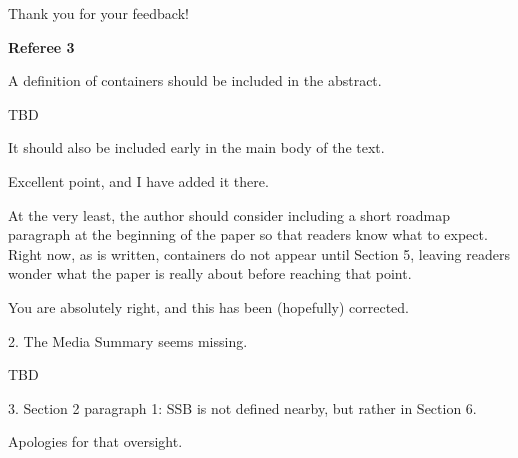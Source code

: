 \begin{response}
    Thank you for your feedback!
\end{response}


\textbf{Referee 3}

\begin{referee}
    A definition of containers should be included in the abstract. 
\end{referee}

\begin{response}
    TBD
\end{response}


\begin{referee}
  It should also be included
early in the main body of the text. \end{referee}

\begin{response}
   Excellent point, and I have added it there.
\end{response}


\begin{referee}
At the very least, the author should consider including a short
roadmap paragraph at the beginning of the paper so that readers know what to expect. Right now, as
is written, containers do not appear until Section 5, leaving readers wonder what the paper is really
about before reaching that point.
\end{referee}

\begin{response}
    You are absolutely right, and this has been (hopefully) corrected.
\end{response}


\begin{referee}

2.
The Media Summary seems missing.

\end{referee}

\begin{response}
    TBD
\end{response}


\begin{referee}

3.
Section 2 paragraph 1: SSB is not defined nearby, but rather in Section 6.
\end{referee}

\begin{response}
    Apologies for that oversight.
\end{response}


